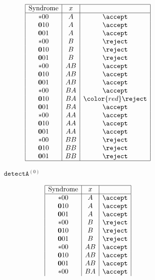 \documentclass[english,letter paper,12pt,reqno]{article}
\theoremstyle{definition}
\newcommand{\detectA}{\texttt{detectA}}
\begin{document}
\begin{figure}[htbp]
    \centering
    \begin{subfigure}[b]{0.45\textwidth}
        \centering
        $$
\begin{array}{|c|c|c|}
\hline
\text{Syndrome} & x & \\
\hline
*00 & A & \accept \\
\bold{0}10 & A & \accept \\
\bold{0}01 & A & \accept \\
*00 & B & \reject \\
\bold{0}10 & B & \reject \\
\bold{0}01 & B & \reject \\
*00 & AB & \accept \\
\bold{0}10 & AB & \accept \\
\bold{0}01 & AB & \accept \\
*00 & BA & \accept \\
\bold{0}10 & BA & {\color{red} \reject} \\
\bold{0}01 & BA & \accept \\
*00 & AA & \accept \\
\bold{0}10 & AA & \accept \\
\bold{0}01 & AA & \accept \\
*00 & BB & \reject \\
\bold{0}10 & BB & \reject \\
\bold{0}01 & BB & \reject \\
\hline
\end{array}
$$
        \caption{$\detectA^{(0)}$}
        \label{fig:detectA_left_syndromes}
    \end{subfigure}
    \hfill
    \begin{subfigure}[b]{0.45\textwidth}
        \centering
        $$
\begin{array}{|c|c|c|}
\hline
\text{Syndrome} & x & \\
\hline
*00 & A & \accept \\
\bold{0}10 & A & \accept \\
\bold{0}01 & A & \accept \\
*00 & B & \reject \\
\bold{0}10 & B & \reject \\
\bold{0}01 & B & \reject \\
*00 & AB & \accept \\
\bold{0}10 & AB & \accept \\
\bold{0}01 & AB & \accept \\
*00 & BA & \accept \\

\end{array}$$
\end{subfigure}
\end{figure}
\end{document}
